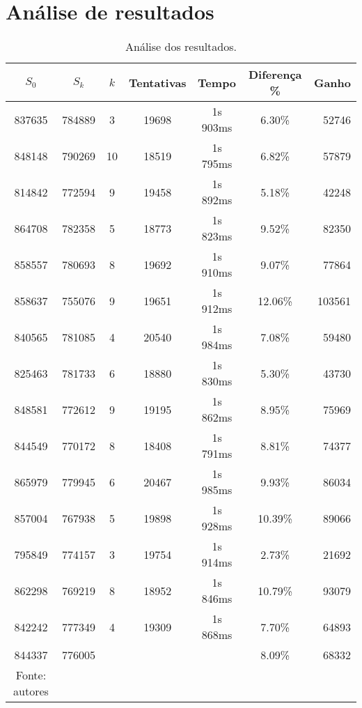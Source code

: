 \documentclass[12pt,a4paper]{article}
\begin{document}
\section{Análise de resultados}

\begin{table}[H]
	\centering
	\caption{Análise dos resultados.}
	\label{tab:resultados}
	\vspace{0.2cm}
	\begin{tabular}{ccccccr}
		\toprule 
		$S_{0}$ & $S_{k}$ & $k$ & Tentativas & Tempo & Diferença \% & Ganho \\ 
		\midrule
		837635 & 784889 &  3 & 19698 & 1s 903ms &  6.30\% &  52746 \\
		848148 & 790269 & 10 & 18519 & 1s 795ms &  6.82\% &  57879 \\
		814842 & 772594 &  9 & 19458 & 1s 892ms &  5.18\% &  42248 \\
		864708 & 782358 &  5 & 18773 & 1s 823ms &  9.52\% &  82350 \\
		858557 & 780693 &  8 & 19692 & 1s 910ms &  9.07\% &  77864 \\
		858637 & 755076 &  9 & 19651 & 1s 912ms & 12.06\% & 103561 \\
		840565 & 781085 &  4 & 20540 & 1s 984ms &  7.08\% &  59480 \\
		825463 & 781733 &  6 & 18880 & 1s 830ms &  5.30\% &  43730 \\
		848581 & 772612 &  9 & 19195 & 1s 862ms &  8.95\% &  75969 \\
		844549 & 770172 &  8 & 18408 & 1s 791ms &  8.81\% &  74377 \\
		865979 & 779945 &  6 & 20467 & 1s 985ms &  9.93\% &  86034 \\
		857004 & 767938 &  5 & 19898 & 1s 928ms & 10.39\% &  89066 \\
		795849 & 774157 &  3 & 19754 & 1s 914ms &  2.73\% &  21692 \\
		862298 & 769219 &  8 & 18952 & 1s 846ms & 10.79\% &  93079 \\
		842242 & 777349 &  4 & 19309 & 1s 868ms &  7.70\% &  64893 \\
		\midrule
		844337 & 776005 &    &       &          &  8.09\% &  68332 \\
		\bottomrule
		\footnotesize Fonte: autores
	\end{tabular}
\end{table}

     


       
\end{document}
